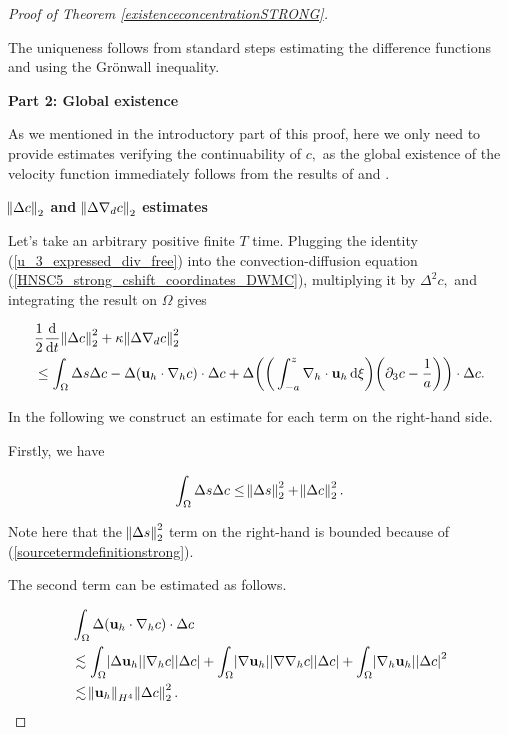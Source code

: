 \documentclass[12pt]{report}
\numberwithin{theorem}{chapter}
\numberwithin{corollary}{chapter}
\numberwithin{lemma}{chapter}
\numberwithin{remark}{chapter}
\numberwithin{definition}{chapter}
\numberwithin{prop}{chapter}
\newcommand*\diff{\mathop{}\!\mathrm{d}}
\begin{document}
\begin{proof}[Proof of Theorem \ref{existenceconcentrationSTRONG}]
\begin{enumerate}
  The uniqueness follows from standard steps estimating the difference functions and using the Gr\"onwall inequality.

\end{enumerate}

\bigskip

\textbf{Part 2: Global existence}

As we mentioned in the introductory part of this proof, here we only need to provide estimates verifying the continuability of $c,$ as the global existence of the velocity function immediately follows from the results of \cite{li2019primitive} and \cite{petcu2005sobolev}.

\bigskip

\textbf{$\norm{\Delta c}_2$ and $\norm{\Delta \nabla_d c}_2$ estimates}

Let's take an arbitrary positive finite $T$ time. Plugging the identity (\ref{u_3_expressed_div_free}) into the convection-diffusion equation (\ref{HNSC5_strong_cshift_coordinates_DWMC}), multiplying it by $\Delta^2 c,$ and integrating the result on $\Omega$ gives

\begin{equation} \label{firstformboundc}
  \begin{split}
    & \frac{1}{2} \frac{\diff}{\diff t} \norm{\Delta c}_2^2 + \kappa \norm{\Delta \nabla_d c}_2^2 \\
    & \leq \int_\Omega \Delta s \Delta c - \Delta ( \mathbf{u}_h \cdot \nabla_h c) \cdot \Delta c + \Delta \bigg ( \bigg ( \int_{-a}^z \nabla_h \cdot \mathbf{u}_h \diff \xi \bigg) \bigg ( \partial_3 c - \frac{1}{a} \bigg) \bigg ) \cdot \Delta c.
  \end{split}
\end{equation}

In the following we construct an estimate for each term on the right-hand side.

  Firstly, we have
  
  \begin{equation} \label{term1estimateGE}
    \int_\Omega \Delta s \Delta c \leq \norm{\Delta s}_2^2 + \norm{\Delta c}_2^2.
  \end{equation}
    
  Note here that the $\norm{\Delta s}_2^2$ term on the right-hand is bounded because of (\ref{sourcetermdefinitionstrong}).
  
  The second term can be estimated as follows.

\begin{equation} \label{term2estimateGE}
  \begin{split}
    & \int_\Omega \Delta ( \mathbf{u}_h \cdot \nabla_h c) \cdot \Delta c \\
    & \lesssim \int_\Omega \abs{\Delta \mathbf{u}_h} \abs{\nabla_h c} \abs{\Delta c} + \int_\Omega \abs{\nabla \mathbf{u}_h} \abs{\nabla \nabla_h c} \abs{\Delta c} + \int_\Omega \abs{\nabla_h \mathbf{u}_h} \abs{\Delta c}^2 \\
    & \lesssim \norm{\mathbf{u}_h}_{H^4} \norm{\Delta c}_2^2.
  \end{split}
\end{equation}
  

\end{proof}
\end{document}
